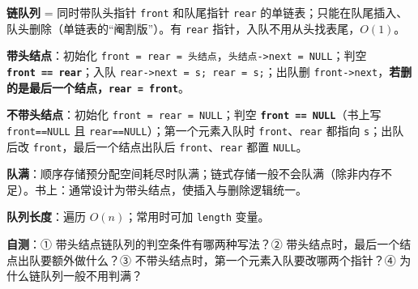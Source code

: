 \documentclass[10.5pt,a4paper,oneside]{article}
\newcommand{\hlred}[1]{\textcolor{wdred}{\bfseries #1}}
\begin{document}
\begin{summarybox}

\textbf{链队列} = 同时带队头指针 \texttt{front} 和队尾指针 \texttt{rear}
的单链表；只能在队尾插入、队头删除（单链表的“阉割版”）。有 \texttt{rear}
指针，入队不用从头找表尾，\(O(1)\)。

\textbf{带头结点}：初始化
\texttt{front\ =\ rear\ =\ 头结点}，\texttt{头结点-\textgreater{}next\ =\ NULL}；判空
\hlred{\texttt{front\ ==\ rear}}；入队
\texttt{rear-\textgreater{}next\ =\ s;\ rear\ =\ s;}；出队删
\texttt{front-\textgreater{}next}，\hlred{若删的是最后一个结点，\texttt{rear\ =\ front}}。

\textbf{不带头结点}：初始化 \texttt{front\ =\ rear\ =\ NULL}；判空
\hlred{\texttt{front\ ==\ NULL}}（书上写 \texttt{front==NULL} 且
\texttt{rear==NULL}）；第一个元素入队时 \texttt{front}、\texttt{rear}
都指向 \texttt{s}；出队后改 \texttt{front}，最后一个结点出队后
\texttt{front}、\texttt{rear} 都置 \texttt{NULL}。

\textbf{队满}：顺序存储预分配空间耗尽时队满；链式存储一般不会队满（除非内存不足）。书上：通常设计为带头结点，使插入与删除逻辑统一。

\textbf{队列长度}：遍历 \(O(n)\)；常用时可加 \texttt{length} 变量。

\textbf{自测}：① 带头结点链队列的判空条件有哪两种写法？②
带头结点时，最后一个结点出队要额外做什么？③
不带头结点时，第一个元素入队要改哪两个指针？④ 为什么链队列一般不用判满？

\end{summarybox}
\end{document}
